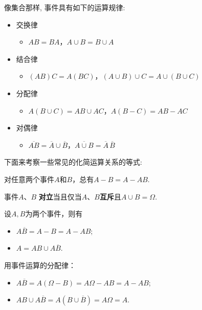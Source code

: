 像集合那样, 事件具有如下的运算规律:
\begin{itemize}
    \item 交换律
          \begin{itemize}
              \item $AB=BA$，$A\cup B=B\cup A$
          \end{itemize}
    \item 结合律
          \begin{itemize}
              \item $(AB)C=A(BC)$，$(A\cup B)\cup C=A\cup(B\cup C)$
          \end{itemize}
    \item 分配律
          \begin{itemize}
              \item $A(B\cup C)=AB\cup AC$，$A(B-C)=AB-AC$
          \end{itemize}
    \item 对偶律
          \begin{itemize}
              \item $\overline{AB}=\overline{A}\cup\overline{B}$，$\overline{A\cup B}=\overline{A}\,\overline{B}$
          \end{itemize}
\end{itemize}

下面来考察一些常见的化简运算关系的等式:

\begin{proposition}
    对任意两个事件$A$和$B$，总有$ A-B=A-AB$.
\end{proposition}

\begin{proposition}
    事件$A$、$B$ \textbf{对立}当且仅当$A$、$B$\textbf{互斥}且$A\cup B=\Omega$.
\end{proposition}
\begin{example}
    设$A,B$为两个事件，则有
    \begin{itemize}
        \item $A\overline{B}=A-B=A-AB$;
        \item $A=AB\cup A\overline{B}$.
    \end{itemize}
\end{example}

\begin{solution}
    用事件运算的分配律：
    \begin{itemize}
        \item $A\overline{B}=A(\Omega-B)=A\Omega-AB=A-AB$;
        \item $AB\cup A\overline{B}=A(B\cup\overline{B})=A\Omega=A$.
    \end{itemize}
\end{solution}

